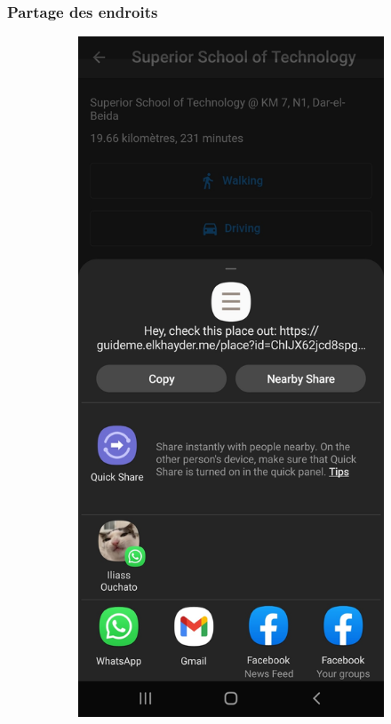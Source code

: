 \FloatBarrier

\subsubsection{Partage des endroits}

\begin{figure}[!htbp]
    \centering
    \begin{subfigure}[t]{.45\linewidth}
        \centering
         \includegraphics[width=\textwidth]{assets/app/share/share.jpg}

\end{subfigure}
\end{figure}
